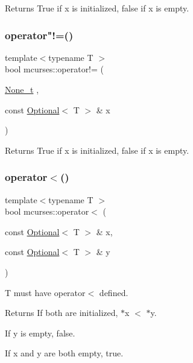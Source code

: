 \begin{DoxyReturn}{Returns}
True if x is initialized, false if x is empty. 
\end{DoxyReturn}
\hypertarget{namespacemcurses_a9de7df455336c7f75d83a33730a0afcc}{}\label{namespacemcurses_a9de7df455336c7f75d83a33730a0afcc} 
\subsubsection{\texorpdfstring{operator"!=()}{operator!=()}\hspace{0.1cm}{\footnotesize\ttfamily [3/3]}}
{\footnotesize\ttfamily template$<$typename T $>$ \\
bool mcurses\+::operator!= (\begin{DoxyParamCaption}\item[{\hyperlink{classmcurses_1_1None__t}{None\+\_\+t}}]{,  }\item[{const \hyperlink{classmcurses_1_1Optional}{Optional}$<$ T $>$ \&}]{x }\end{DoxyParamCaption})\hspace{0.3cm}{\ttfamily [noexcept]}}

\begin{DoxyReturn}{Returns}
True if x is initialized, false if x is empty. 
\end{DoxyReturn}
\hypertarget{namespacemcurses_a4446fbcb636faa08aba60b849f8036bb}{}\label{namespacemcurses_a4446fbcb636faa08aba60b849f8036bb} 
\subsubsection{\texorpdfstring{operator$<$()}{operator<()}}
{\footnotesize\ttfamily template$<$typename T $>$ \\
bool mcurses\+::operator$<$ (\begin{DoxyParamCaption}\item[{const \hyperlink{classmcurses_1_1Optional}{Optional}$<$ T $>$ \&}]{x,  }\item[{const \hyperlink{classmcurses_1_1Optional}{Optional}$<$ T $>$ \&}]{y }\end{DoxyParamCaption})}

T must have operator$<$ defined. \begin{DoxyReturn}{Returns}
If both are initialized, $\ast$x $<$ $\ast$y. 

If y is empty, false. 

If x and y are both empty, true. 
\end{DoxyReturn}
\hypertarget{namespacemcurses_a8bcaf66160e4b46f3b160c4af4c289ac}{}\label{namespacemcurses_a8bcaf66160e4b46f3b160c4af4c289ac} 
